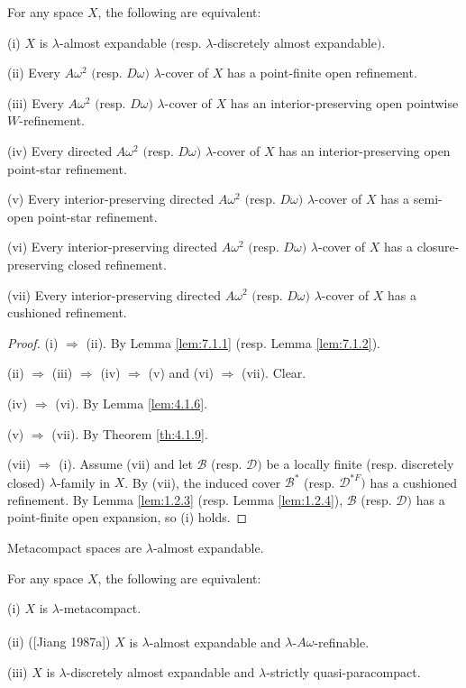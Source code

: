 \documentclass[main.tex]{subfiles}
\begin{document}
{\theorem{} \label{th:7.1.3}
	For any space $X$, the following are equivalent:

\textup{(i)}  $X$ is $\lambda$-almost expandable $($resp. $\lambda$-discretely almost expandable$)$.

\textup{(ii)}  Every $A\omega^2$ $($resp. $D\omega)$ $\lambda$-cover of $X$ has a point-finite open refinement.

\textup{(iii)}  Every $A\omega^2$ $($resp. $D\omega)$ $\lambda$-cover of $X$ has an interior-preserving open pointwise $W$-refinement.

\textup{(iv)}  Every directed $A\omega^2$ $($resp. $D\omega)$ $\lambda$-cover of $X$ has an interior-preserving open point-star refinement.

\textup{(v)}  Every interior-preserving directed $A\omega^2$ $($resp. $D\omega)$ $\lambda$-cover of $X$ has a semi-open point-star refinement.

\textup{(vi)}  Every interior-preserving directed $A\omega^2$ $($resp. $D\omega)$ $\lambda$-cover 
of $X$ has a closure-preserving  closed refinement.

\textup{(vii)}  Every interior-preserving directed $A\omega^2$ $($resp. $D\omega)$ $\lambda$-cover 
of $X$ has a cushioned refinement.
}

\begin{proof}
(i) $\Rightarrow$ (ii). By Lemma \ref{lem:7.1.1} (resp. Lemma \ref{lem:7.1.2}).

(ii) $\Rightarrow$ (iii) $\Rightarrow$ (iv) $\Rightarrow$ (v) and (vi) $\Rightarrow$ (vii). Clear.

(iv) $\Rightarrow$ (vi). By Lemma \ref{lem:4.1.6}.

(v) $\Rightarrow$ (vii). By Theorem \ref{th:4.1.9}.

(vii) $\Rightarrow$ (i). Assume (vii) and let $\mathscr{B}$ (resp. $\mathscr{D})$ be 
a locally finite (resp. discretely closed) $\lambda$-family in $X$. By (vii), the induced cover
 $\mathscr{B}^*$ (resp. $\mathscr{D}^{*F})$ has a cushioned refinement. 
 By Lemma \ref{lem:1.2.3} (resp. Lemma \ref{lem:1.2.4}), $\mathscr{B}$ (resp. $\mathscr{D})$ 
 has a point-finite open expansion, so (i) holds.
\end{proof}

{\corollary{} \label{cor:7.1.4}
Metacompact spaces are $\lambda$-almost expandable.\hfill\qedsymbol
}

{\theorem{} \label{th:7.1.5}
For any space $X$, the following are equivalent:

\textup{(i)}  $X$ is $\lambda$-metacompact.


\textup{(ii)  ([Jiang 1987a]\textsuperscript{\cite{Jiang1987a}})} $X$ is $\lambda$-almost expandable and $\lambda$-$A\omega$-refinable.


\textup{(iii)}  $X$ is $\lambda$-discretely almost expandable and $\lambda$-strictly quasi-paracompact.
}
\end{document}
